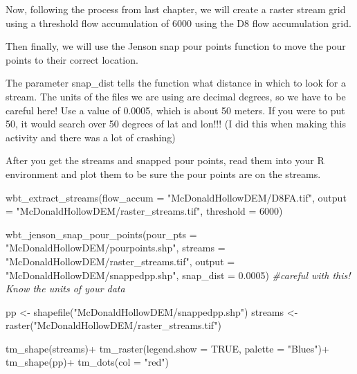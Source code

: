 \documentclass[
]{book}
\newenvironment{Shaded}{\begin{snugshade}}{\end{snugshade}}
\newcommand{\AttributeTok}[1]{\textcolor[rgb]{0.77,0.63,0.00}{#1}}
\newcommand{\CommentTok}[1]{\textcolor[rgb]{0.56,0.35,0.01}{\textit{#1}}}
\newcommand{\ConstantTok}[1]{\textcolor[rgb]{0.00,0.00,0.00}{#1}}
\newcommand{\DecValTok}[1]{\textcolor[rgb]{0.00,0.00,0.81}{#1}}
\newcommand{\FloatTok}[1]{\textcolor[rgb]{0.00,0.00,0.81}{#1}}
\newcommand{\FunctionTok}[1]{\textcolor[rgb]{0.00,0.00,0.00}{#1}}
\newcommand{\NormalTok}[1]{#1}
\newcommand{\OtherTok}[1]{\textcolor[rgb]{0.56,0.35,0.01}{#1}}
\newcommand{\SpecialCharTok}[1]{\textcolor[rgb]{0.00,0.00,0.00}{#1}}
\newcommand{\StringTok}[1]{\textcolor[rgb]{0.31,0.60,0.02}{#1}}
\begin{document}
Now, following the process from last chapter, we will create a raster stream grid using a threshold flow accumulation of 6000 using the D8 flow accumulation grid.

Then finally, we will use the Jenson snap pour points function to move the pour points to their correct location.

The parameter snap\_dist tells the function what distance in which to look for a stream. The units of the files we are using are decimal degrees, so we have to be careful here! Use a value of 0.0005, which is about 50 meters. If you were to put 50, it would search over 50 degrees of lat and lon!!! (I did this when making this activity and there was a lot of crashing)

After you get the streams and snapped pour points, read them into your R environment and plot them to be sure the pour points are on the streams.

\begin{Shaded}
\begin{Highlighting}[]
\FunctionTok{wbt\_extract\_streams}\NormalTok{(}\AttributeTok{flow\_accum =} \StringTok{"McDonaldHollowDEM/D8FA.tif"}\NormalTok{,}
                    \AttributeTok{output =} \StringTok{"McDonaldHollowDEM/raster\_streams.tif"}\NormalTok{,}
                    \AttributeTok{threshold =} \DecValTok{6000}\NormalTok{)}

\FunctionTok{wbt\_jenson\_snap\_pour\_points}\NormalTok{(}\AttributeTok{pour\_pts =} \StringTok{"McDonaldHollowDEM/pourpoints.shp"}\NormalTok{,}
                            \AttributeTok{streams =} \StringTok{"McDonaldHollowDEM/raster\_streams.tif"}\NormalTok{,}
                            \AttributeTok{output =} \StringTok{"McDonaldHollowDEM/snappedpp.shp"}\NormalTok{,}
                            \AttributeTok{snap\_dist =} \FloatTok{0.0005}\NormalTok{) }\CommentTok{\#careful with this! Know the units of your data}

\NormalTok{pp }\OtherTok{\textless{}{-}} \FunctionTok{shapefile}\NormalTok{(}\StringTok{"McDonaldHollowDEM/snappedpp.shp"}\NormalTok{)}
\NormalTok{streams }\OtherTok{\textless{}{-}} \FunctionTok{raster}\NormalTok{(}\StringTok{"McDonaldHollowDEM/raster\_streams.tif"}\NormalTok{)}

\FunctionTok{tm\_shape}\NormalTok{(streams)}\SpecialCharTok{+}
  \FunctionTok{tm\_raster}\NormalTok{(}\AttributeTok{legend.show =} \ConstantTok{TRUE}\NormalTok{, }\AttributeTok{palette =} \StringTok{"Blues"}\NormalTok{)}\SpecialCharTok{+}
\FunctionTok{tm\_shape}\NormalTok{(pp)}\SpecialCharTok{+}
  \FunctionTok{tm\_dots}\NormalTok{(}\AttributeTok{col =} \StringTok{"red"}\NormalTok{)}
\end{Highlighting}
\end{Shaded}
\end{document}
